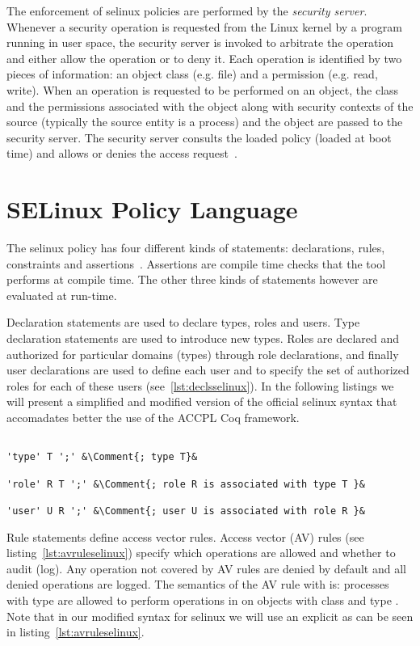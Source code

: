 The enforcement of \ac{selinux} policies are performed by the \emph{security server}. Whenever a security operation is requested from the Linux kernel by a program running in user space, the security server is invoked to arbitrate the operation and either allow the operation or to deny it. Each operation is identified by two pieces of information: an object class (e.g. file) and a permission (e.g. read, write). When an operation is requested to be performed on an object, the class and the permissions associated with the object along with security contexts of the source (typically the source entity is a process) and the object are passed to the security server. The security server consults the loaded policy (loaded at boot time) and allows or denies the access request~\cite{Sarna}.

\section{SELinux Policy Language}

The \ac{selinux} policy has four different kinds of statements: declarations, rules, constraints and assertions~\cite{ArcherLP03}. Assertions are compile time checks that the  tool performs at compile time. The other three kinds of statements however are evaluated at run-time. 

Declaration statements are used to declare types, roles and users. Type declaration statements are used to introduce new types. Roles are declared and authorized for particular domains (types) through role declarations, and finally user declarations are used to define each user and to specify the set of authorized roles for each of these users (see~\ref{lst:declsselinux}). In the following listings we will present a simplified and modified version of the official \ac{selinux} syntax that accomadates better the use of the \ac{ACCPL} Coq framework.

\lstset{language=selinux}
\begin{lstlisting}[frame=single, caption={Declaration Statements},label={lst:declsselinux}]

'type' T ';' &\Comment{; type T}&

'role' R T ';' &\Comment{; role R is associated with type T }&

'user' U R ';' &\Comment{; user U is associated with role R }&

\end{lstlisting}

Rule statements define access vector rules. Access vector (AV) rules (see listing~\ref{lst:avruleselinux}) specify which operations are allowed and whether to audit (log). Any operation not covered by AV rules are denied by default and all denied operations are logged. The semantics of the AV rule with   is: processes with type  are allowed to perform operations in  on objects with class  and type . Note that in our modified syntax for \ac{selinux} we will use an explicit  as can be seen in listing~\ref{lst:avruleselinux}.

